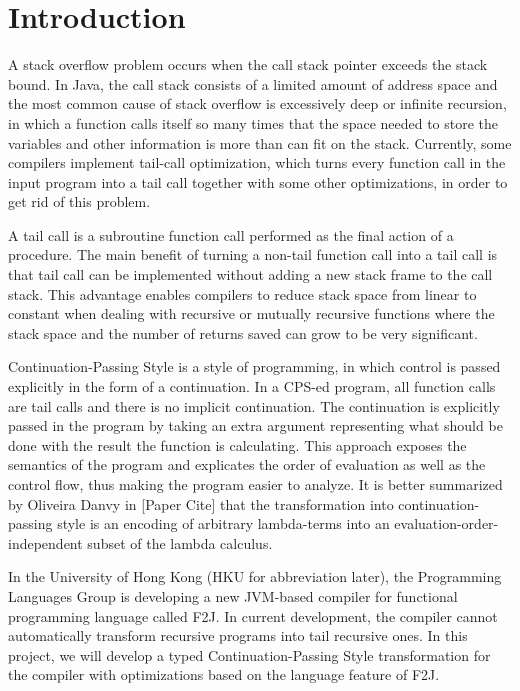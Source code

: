 \chapter{Introduction}

A stack overflow problem occurs when the call stack pointer exceeds the stack bound. In Java, the call stack consists of a limited amount of address space and the most common cause of stack overflow is excessively deep or infinite recursion, in which a function calls itself so many times that the space needed to store the variables and other information is more than can fit on the stack. Currently, some compilers implement tail-call optimization, which turns every function call in the input program into a tail call together with some other optimizations, in order to get rid of this problem. 

A tail call is a subroutine function call performed as the final action of a procedure. The main benefit of turning a non-tail function call into a tail call is that tail call can be implemented without adding a new stack frame to the call stack. This advantage enables compilers to reduce stack space from linear to constant when dealing with recursive or mutually recursive functions where the stack space and the number of returns saved can grow to be very significant.

Continuation-Passing Style is a style of programming, in which control is passed explicitly in the form of a continuation. In a CPS-ed program, all function calls are tail calls and there is no implicit continuation. The continuation is explicitly passed in the program by taking an extra argument representing what should be done with the result the function is calculating. This approach exposes the semantics of the program and explicates the order of evaluation as well as the control flow, thus making the program easier to analyze. It is better summarized by Oliveira Danvy in [Paper Cite] that the transformation into continuation-passing style is an encoding of arbitrary lambda-terms into an evaluation-order-independent subset of the lambda calculus.

In the University of Hong Kong (HKU for abbreviation later), the Programming Languages Group is developing a new JVM-based compiler for functional programming language called F2J. In current development, the compiler cannot automatically transform recursive programs into tail recursive ones. In this project, we will develop a typed Continuation-Passing Style transformation for the compiler with optimizations based on the language feature of F2J. 


